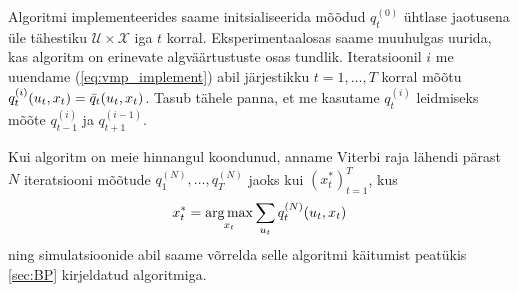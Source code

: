 
Algoritmi implementeerides saame initsialiseerida mõõdud $q_t^{(0)}$ ühtlase jaotusena üle tähestiku $\mathcal{U} \times \mathcal{X}$ iga $t$ korral. Eksperimentaalosas saame muuhulgas uurida, kas algoritm on erinevate algväärtustuste osas tundlik. Iteratsioonil $i$ me uuendame (\ref{eq:vmp_implement}) abil järjestikku $t = 1, \ldots, T$ korral mõõtu $q_t^{(i)}(u_t,x_t) = \Bar{q}_t(u_t, x_t)$. Tasub tähele panna, et me kasutame $q_t^{(i)}$ leidmiseks mõõte $q_{t-1}^{(i)}$ ja $q_{t+1}^{(i-1)}$.

Kui algoritm on meie hinnangul koondunud, anname Viterbi raja lähendi pärast $N$ iteratsiooni mõõtude $q_1^{(N)},\ldots,q_T^{(N)}$ jaoks kui $(x^*_t)_{t=1}^T$, kus
$$x^*_t = \operatorname*{arg\,max}_{x_t} \sum_{u_t} q_t^{(N)}(u_t, x_t)$$
ning simulatsioonide abil saame võrrelda selle algoritmi käitumist peatükis \ref{sec:BP} kirjeldatud algoritmiga.




